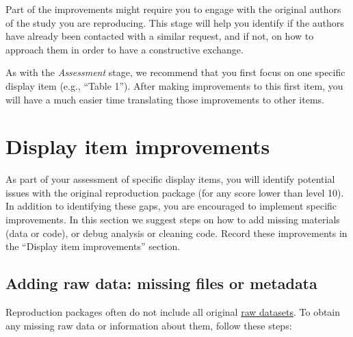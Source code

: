 \documentclass[
]{book}
\begin{document}
Part of the improvements might require you to engage with the original authors of the study you are reproducing. This stage will help you identify if the authors have already been contacted with a similar request, and if not, on how to approach them in order to have a constructive exchange.

As with the \emph{Assessment} stage, we recommend that you first focus on one specific display item (e.g., ``Table 1''). After making improvements to this first item, you will have a much easier time translating those improvements to other items.

\hypertarget{di-imp}{%
\section{Display item improvements}\label{di-imp}}

As part of your assessment of specific display items, you will identify potential issues with the original reproduction package (for any score lower than level 10). In addition to identifying these gaps, you are encouraged to implement specific improvements. In this section we suggest steps on how to add missing materials (data or code), or debug analysis or cleaning code. Record these improvements in the ``Display item improvements'' section.

\hypertarget{rd}{%
\subsection{Adding raw data: missing files or metadata}\label{rd}}

Reproduction packages often do not include all original \protect\hyperlink{describe-inputs}{raw datasets}. To obtain any missing raw data or information about them, follow these steps:
\end{document}

